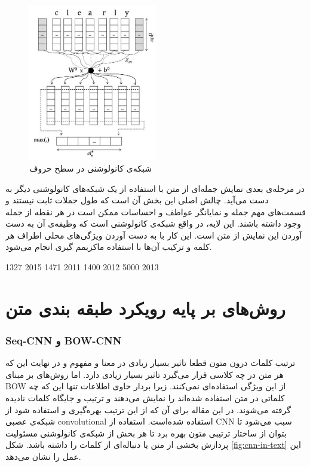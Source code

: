 \documentclass[12pt, a4paper, oneside]{report}
\begin{document}
\begin{figure}[h]
    \centering
    \includegraphics[width=0.5\textwidth]{CHARCNN}
    \caption{ شبکه‌ی کانولوشنی در سطح حروف }
    \label{fig:CHARCNN}
\end{figure}

در مرحله‌ی بعدی نمایش جمله‌ای از متن با استفاده از یک شبکه‌های کانولوشنی دیگر به دست می‌آید.
چالش اصلی این بخش آن است که طول جملات ثابت نیستند و قسمت‌های مهم جمله و نمایانگر عواطف و احساسات
ممکن است در هر نقطه از جمله وجود داشته باشند. این لایه، در واقع شبکه‌ی کانولوشنی است که وظیفه‌ی آن
به دست آوردن این نمایش از متن است. این کار با به دست آوردن ویژگی‌های محلی اطراف هر کلمه و ترکیب
آن‌ها با استفاده ماکزیمم گیری انجام می‌شود.




\cite{tang-etal-2015-document} 1327 2015
\cite{socher-etal-2011-semi} 1471 2011
\cite{socher-etal-2012-semantic} 1400 2012
\cite{socher-etal-2013-recursive} 5000 2013


\section{روش‌های بر پایه رویکرد طبقه بندی متن}

\subsubsection{Seq-CNN و ‌BOW-CNN}

ترتیب کلمات درون متون قطعا تاثیر بسیار زیادی در معنا و مفهوم و در نهایت این که هر متن در چه کلاسی قرار می‌گیرد
تاثیر بسیار زیادی دارد. اما روش‌های بر مبنای
BOW
از این ویژگی استفاده‌ای نمی‌کنند. زیرا بردار حاوی اطلاعات تنها این که چه کلماتی در متن استفاده شده‌اند را نمایش می‌دهند
و ترتیب و جایگاه کلمات نادیده گرفته می‌شوند. در این مقاله برای آن که از این ترتیب بهره‌گیری و استفاده شود از شبکه‌ی عصبی
convolutional
استفاده شده‌است. استفاده از
CNN
سبب می‌شود تا بتوان از ساختار ترتیبی متون بهره برد تا هر بخش از شبکه‌ی کانولوشنی مسئولیت پردازش بخشی از متن
یا دنباله‌ای از کلمات را داشته باشد. شکل
\ref{fig:cnn-in-text}
این عمل را نشان می‌دهد.
\end{document}
